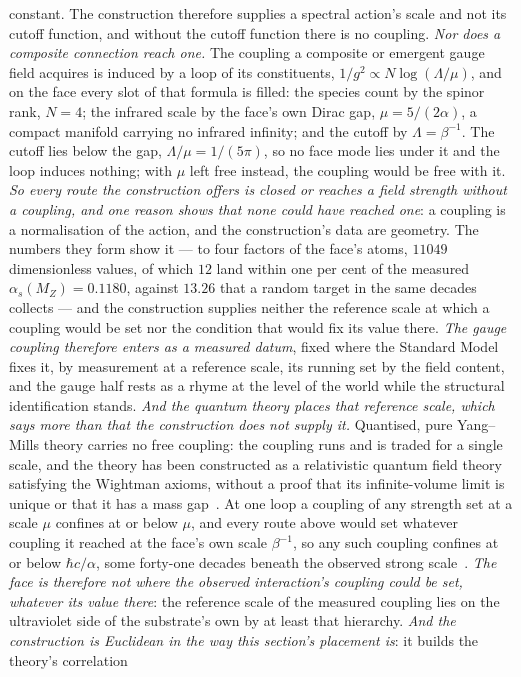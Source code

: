 \documentclass[11pt]{article}
\theoremstyle{plain}
\theoremstyle{remark}
\begin{document}
constant. The construction therefore supplies a spectral action's scale and not its cutoff function, and without the cutoff function there is no coupling. \emph{Nor does a composite connection reach one.} The coupling a composite or emergent gauge field acquires is induced by a loop of its constituents, $1/g^{2}\propto N\log(\Lambda/\mu)$, and on the face every slot of that formula is filled: the species count by the spinor rank, $N=4$; the infrared scale by the face's own Dirac gap, $\mu=5/(2\alpha)$, a compact manifold carrying no infrared infinity; and the cutoff by $\Lambda=\beta^{-1}$. The cutoff lies below the gap, $\Lambda/\mu=1/(5\pi)$, so no face mode lies under it and the loop induces nothing; with $\mu$ left free instead, the coupling would be free with it. \emph{So every route the construction offers is closed or reaches a field strength without a coupling, and one reason shows that none could have reached one}: a coupling is a normalisation of the action, and the construction's data are geometry. The numbers they form show it --- to four factors of the face's atoms, $11049$ dimensionless values, of which $12$ land within one per cent of the measured $\alpha_s(M_Z)=0.1180$, against $13.26$ that a random target in the same decades collects --- and the construction supplies neither the reference scale at which a coupling would be set nor the condition that would fix its value there. \emph{The gauge coupling therefore enters as a measured datum}, fixed where the Standard Model fixes it, by measurement at a reference scale, its running set by the field content, and the gauge half rests as a rhyme at the level of the world while the structural identification stands. \emph{And the quantum theory places that reference scale, which says more than that the construction does not supply it.} Quantised, pure Yang--Mills theory carries no free coupling: the coupling runs and is traded for a single scale, and the theory has been constructed as a relativistic quantum field theory satisfying the Wightman axioms, without a proof that its infinite-volume limit is unique or that it has a mass gap~\cite{YMGroup2026}. At one loop a coupling of any strength set at a scale $\mu$ confines at or below $\mu$, and every route above would set whatever coupling it reached at the face's own scale $\beta^{-1}$, so any such coupling confines at or below $\hbar c/\alpha$, some forty-one decades beneath the observed strong scale~\cite{JanzenMatter}. \emph{The face is therefore not where the observed interaction's coupling could be set, whatever its value there}: the reference scale of the measured coupling lies on the ultraviolet side of the substrate's own by at least that hierarchy. \emph{And the construction is Euclidean in the way this section's placement is}: it builds the theory's correlation 
\end{document}
